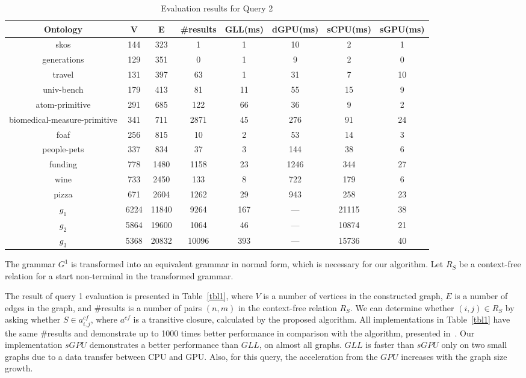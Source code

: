 \begin{table*}[h]
\centering
\caption{Evaluation results for Query 2}
\label{tbl2}

\begin{tabular}{ | c | c | c | c | c | c | c | c |}
\hline
Ontology & V & E & \#results & GLL(ms) & dGPU(ms) & sCPU(ms) & sGPU(ms)\\
\hline 
\hline
skos        & 144 & 323 & 1 & 1 & 10 & 2 & 1\\
generations & 129 & 351 & 0 & 1 & 9 & 2 & 0\\
travel      & 131 & 397 & 63 & 1 & 31 & 7 & 10\\
univ-bench  & 179 & 413 & 81 & 11 & 55 & 15 & 9\\
atom-primitive & 291 & 685 & 122 & 66 & 36 & 9 & 2\\
biomedical-measure-primitive & 341 & 711 & 2871 & 45 & 276 & 91 & 24\\
foaf        & 256 & 815 & 10 & 2 & 53 & 14 & 3\\
people-pets & 337 & 834 & 37 & 3 & 144 & 38 & 6\\
funding     & 778 & 1480 & 1158 & 23 & 1246 & 344 & 27\\
wine        & 733 & 2450 & 133 & 8 & 722 & 179 & 6\\
pizza       & 671 & 2604 & 1262 & 29 & 943 & 258 & 23\\
$g_{1}$     & 6224 & 11840 & 9264 & 167 & --- & 21115 & 38\\
$g_{2}$     & 5864 & 19600 & 1064 & 46 & --- & 10874 & 21\\
$g_{3}$     & 5368 & 20832 & 10096 & 393 & --- & 15736 & 40\\
\hline
\end{tabular}

\end{table*}


The grammar $G^1$ is transformed into an equivalent grammar in normal form, which is necessary for our algorithm. Let $R_S$ be a context-free relation for a start non-terminal in the transformed grammar.

The result of query 1 evaluation is presented in Table~\ref{tbl1}, where $V$ is a number of vertices in the constructed graph, $E$ is a number of edges in the graph, and \#results is a number of pairs $(n,m)$ in the context-free relation $R_S$. We can determine whether $(i,j) \in R_S$ by asking whether $S \in a^{cf}_{i,j}$, where $a^{cf}$ is a transitive closure, calculated by the proposed algorithm. All implementations in Table~\ref{tbl1} have the same \#results and demonstrate up to 1000 times better performance in comparison with the algorithm, presented in~\cite{RDF}. Our implementation $sGPU$ demonstrates a better performance than $GLL$, on almost all graphs. $GLL$ is faster than $sGPU$ only on two small graphs due to a data transfer between CPU and GPU. Also, for this query, the acceleration from the $GPU$ increases with the graph size growth.

